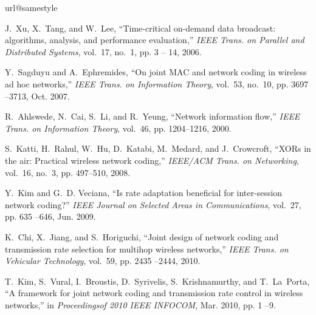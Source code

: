 \documentclass[journal]{IEEEtran}
\begin{document}
\begin{thebibliography}{10}
\providecommand{\url}[1]{#1}
\csname url@samestyle\endcsname
\providecommand{\newblock}{\relax}
\providecommand{\bibinfo}[2]{#2}
\providecommand{\BIBentrySTDinterwordspacing}{\spaceskip=0pt\relax}
\providecommand{\BIBentryALTinterwordstretchfactor}{4}
\providecommand{\BIBentryALTinterwordspacing}{\spaceskip=\fontdimen2\font plus
\BIBentryALTinterwordstretchfactor\fontdimen3\font minus
  \fontdimen4\font\relax}
\providecommand{\BIBforeignlanguage}[2]{{\expandafter\ifx\csname l@#1\endcsname\relax
\typeout{** WARNING: IEEEtran.bst: No hyphenation pattern has been}\typeout{** loaded for the language `#1'. Using the pattern for}\typeout{** the default language instead.}\else
\language=\csname l@#1\endcsname
\fi
#2}}
\providecommand{\BIBdecl}{\relax}
\BIBdecl

J.~Xu, X.~Tang, and W.~Lee, ``Time-critical on-demand data broadcast:
  algorithms, analysis, and performance evaluation,'' \emph{{IEEE} Trans. on
  Parallel and Distributed Systems}, vol.~17, no.~1, pp. 3 -- 14, 2006.

Y.~Sagduyu and A.~Ephremides, ``On joint {MAC} and network coding in wireless
  ad hoc networks,'' \emph{{IEEE} Trans. on Information Theory}, vol.~53,
  no.~10, pp. 3697 --3713, Oct. 2007.

R.~Ahlswede, N.~Cai, S.~Li, and R.~Yeung, ``Network information flow,''
  \emph{{IEEE} Trans. on Information Theory}, vol.~46, pp. 1204--1216, 2000.

S.~Katti, H.~Rahul, W.~Hu, D.~Katabi, M.~Medard, and J.~Crowcroft, ``{XORs} in
  the air: Practical wireless network coding,'' \emph{{IEEE/ACM} Trans. on
  Networking}, vol.~16, no.~3, pp. 497--510, 2008.

Y.~Kim and G.~D. Veciana, ``Is rate adaptation beneficial for inter-session
  network coding?'' \emph{{IEEE} Journal on Selected Areas in Communications},
  vol.~27, pp. 635 --646, Jun. 2009.

K.~Chi, X.~Jiang, and S.~Horiguchi, ``Joint design of network coding and
  transmission rate selection for multihop wireless networks,'' \emph{{IEEE}
  Trans. on Vehicular Technology}, vol.~59, pp. 2435 --2444, 2010.

T.~Kim, S.~Vural, I.~Broustis, D.~Syrivelis, S.~Krishnamurthy, and T.~La~Porta,
  ``A framework for joint network coding and transmission rate control in
  wireless networks,'' in \emph{Proceedingsof 2010 {IEEE} {INFOCOM}}, Mar.
  2010, pp. 1 --9.


\end{thebibliography}
\end{document}
